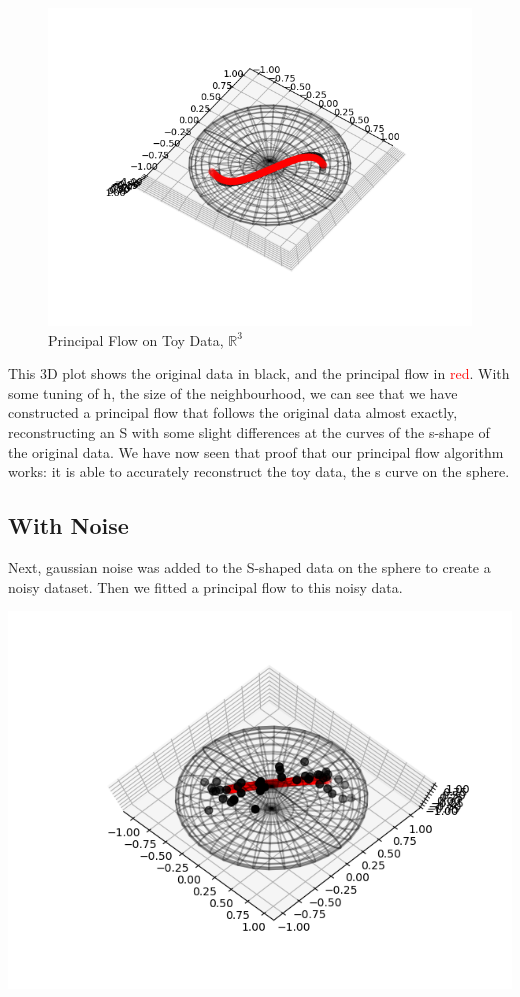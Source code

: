 \documentclass[12pt]{report}
\begin{document}
\begin{figure}[h]
    \begin{center}
        \includegraphics[]{single_flow_13.png}
        \caption{Principal Flow on Toy Data, $\mathbb{R}^3$}
        \label{fig:pflowtoy}
    \end{center}
\end{figure}

This 3D plot shows the original data in black, and the principal flow in 
\textcolor{red}{red}.
With some tuning of h, the size of the neighbourhood, we can see that we have constructed
a principal flow that follows the original data almost
exactly, reconstructing an S with some slight differences at the curves of the s-shape of
the original data.
We have now seen that proof that our principal flow algorithm works:
it is able to accurately reconstruct the toy data, 
the s curve on the sphere.

\subsection{With Noise}

Next, gaussian noise was added to the S-shaped data on the sphere to create a noisy dataset.
Then we fitted a principal flow to this noisy data.

\includegraphics[]{noisy_13.png}
\end{document}

